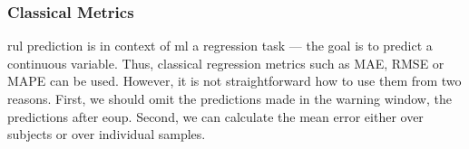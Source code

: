     
    



\subsubsection{Classical Metrics}

\Acrshort{rul} prediction is in context of \acrshort{ml} a regression task --- the goal is to predict a continuous variable.
Thus, classical regression metrics such as MAE, RMSE or MAPE can be used.
However, it is not straightforward how to use them from two reasons.
First, we should omit the predictions made in the warning window, the predictions after \acrshort{eoup}.
Second, we can calculate the mean error either over subjects or over individual samples.

